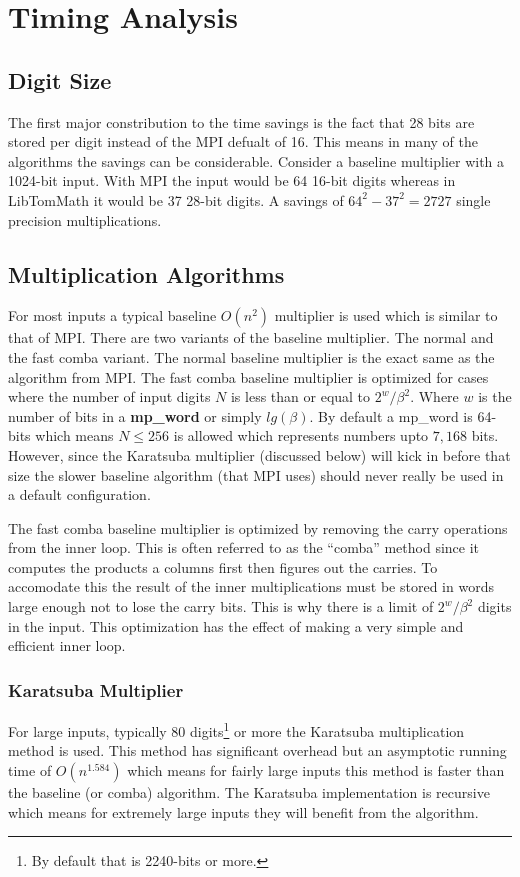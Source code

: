 \documentclass[]{article}
\begin{document}
\section{Timing Analysis}

\subsection{Digit Size}
The first major constribution to the time savings is the fact that 28 bits are stored per digit instead of the MPI 
defualt of 16.  This means in many of the algorithms the savings can be considerable.  Consider a baseline multiplier 
with a 1024-bit input.  With MPI the input would be 64 16-bit digits whereas in LibTomMath it would be 37 28-bit digits.
A savings of $64^2 - 37^2 = 2727$ single precision multiplications.  

\subsection{Multiplication Algorithms}
For most inputs a typical baseline $O(n^2)$ multiplier is used which is similar to that of MPI.  There are two variants 
of the baseline multiplier.  The normal and the fast comba variant.  The normal baseline multiplier is the exact same as 
the algorithm from MPI.  The fast comba baseline multiplier is optimized for cases where the number of input digits $N$ 
is less than or equal to $2^{w}/\beta^2$.  Where $w$ is the number of bits in a \textbf{mp\_word} or simply $lg(\beta)$.
By default a mp\_word is 64-bits which means $N \le 256$ is allowed which represents numbers upto $7,168$ bits.  However,
since the Karatsuba multiplier (discussed below) will kick in before that size the slower baseline algorithm (that MPI
uses) should never really be used in a default configuration.  

The fast comba baseline multiplier is optimized by removing the carry operations from the inner loop.  This is often 
referred to as the ``comba'' method since it computes the products a columns first then figures out the carries.  To
accomodate this the result of the inner multiplications must be stored in words large enough not to lose the carry bits.  
This is why there is a limit of $2^{w}/\beta^2$ digits in the input.  This optimization has the effect of making a 
very simple and efficient inner loop.

\subsubsection{Karatsuba Multiplier}
For large inputs, typically 80 digits\footnote{By default that is 2240-bits or more.} or more the Karatsuba multiplication
method is used.  This method has significant overhead but an asymptotic running time of $O(n^{1.584})$ which means for 
fairly large inputs this method is faster than the baseline (or comba) algorithm.  The Karatsuba implementation is 
recursive which means for extremely large inputs they will benefit from the algorithm.
\end{document}
